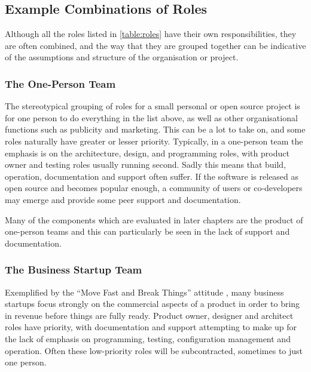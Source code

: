 \subsection{Example Combinations of Roles}

Although all the roles listed in \autoref{table:roles} have their own responsibilities, they are often combined, and the way that they are grouped together can be indicative of the assumptions and structure of the organisation or project.

\subsubsection{The One-Person Team}
The stereotypical grouping of roles for a small personal or open source project is for one person to do everything in the list above, as well as other organisational functions such as publicity and marketing. This can be a lot to take on, and some roles naturally have greater or lesser priority. Typically, in a one-person team the emphasis is on the architecture, design, and programming roles, with product owner and testing roles usually running second. Sadly this means that build, operation, documentation and support often suffer. If the software is released as open source and becomes popular enough, a community of users or co-developers may emerge and provide some peer support and documentation.

Many of the components which are evaluated in later chapters are the product of one-person teams and this can particularly be seen in the lack of support and documentation.

\subsubsection{The Business Startup Team}
Exemplified by the \enquote{Move Fast and Break Things} attitude \citep{Taplin2018}, many business startups focus strongly on the commercial aspects of a product in order to bring in revenue before things are fully ready. Product owner, designer and architect roles have priority, with documentation and support attempting to make up for the lack of emphasis on programming, testing, configuration management and operation. Often these low-priority roles will be subcontracted, sometimes to just one person.

